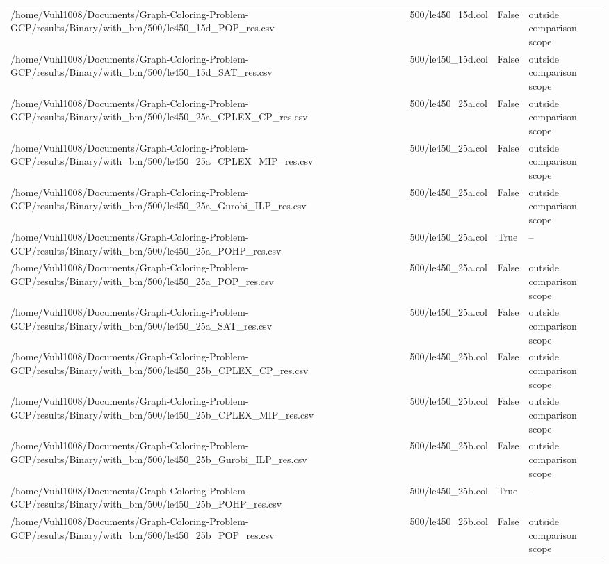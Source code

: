 \begin{table}[htbp]
\begin{tabular}{llll}
/home/Vuhl1008/Documents/Graph-Coloring-Problem-GCP/results/Binary/with\_bm/500/le450\_15d\_POP\_res.csv & 500/le450\_15d.col & False & outside comparison scope \\
/home/Vuhl1008/Documents/Graph-Coloring-Problem-GCP/results/Binary/with\_bm/500/le450\_15d\_SAT\_res.csv & 500/le450\_15d.col & False & outside comparison scope \\
/home/Vuhl1008/Documents/Graph-Coloring-Problem-GCP/results/Binary/with\_bm/500/le450\_25a\_CPLEX\_CP\_res.csv & 500/le450\_25a.col & False & outside comparison scope \\
/home/Vuhl1008/Documents/Graph-Coloring-Problem-GCP/results/Binary/with\_bm/500/le450\_25a\_CPLEX\_MIP\_res.csv & 500/le450\_25a.col & False & outside comparison scope \\
/home/Vuhl1008/Documents/Graph-Coloring-Problem-GCP/results/Binary/with\_bm/500/le450\_25a\_Gurobi\_ILP\_res.csv & 500/le450\_25a.col & False & outside comparison scope \\
/home/Vuhl1008/Documents/Graph-Coloring-Problem-GCP/results/Binary/with\_bm/500/le450\_25a\_POHP\_res.csv & 500/le450\_25a.col & True & -- \\
/home/Vuhl1008/Documents/Graph-Coloring-Problem-GCP/results/Binary/with\_bm/500/le450\_25a\_POP\_res.csv & 500/le450\_25a.col & False & outside comparison scope \\
/home/Vuhl1008/Documents/Graph-Coloring-Problem-GCP/results/Binary/with\_bm/500/le450\_25a\_SAT\_res.csv & 500/le450\_25a.col & False & outside comparison scope \\
/home/Vuhl1008/Documents/Graph-Coloring-Problem-GCP/results/Binary/with\_bm/500/le450\_25b\_CPLEX\_CP\_res.csv & 500/le450\_25b.col & False & outside comparison scope \\
/home/Vuhl1008/Documents/Graph-Coloring-Problem-GCP/results/Binary/with\_bm/500/le450\_25b\_CPLEX\_MIP\_res.csv & 500/le450\_25b.col & False & outside comparison scope \\
/home/Vuhl1008/Documents/Graph-Coloring-Problem-GCP/results/Binary/with\_bm/500/le450\_25b\_Gurobi\_ILP\_res.csv & 500/le450\_25b.col & False & outside comparison scope \\
/home/Vuhl1008/Documents/Graph-Coloring-Problem-GCP/results/Binary/with\_bm/500/le450\_25b\_POHP\_res.csv & 500/le450\_25b.col & True & -- \\
/home/Vuhl1008/Documents/Graph-Coloring-Problem-GCP/results/Binary/with\_bm/500/le450\_25b\_POP\_res.csv & 500/le450\_25b.col & False & outside comparison scope \\

\end{tabular}
\end{table}
